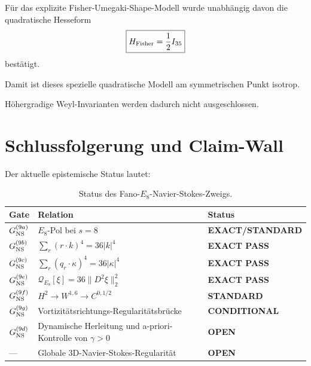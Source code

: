 \documentclass[11pt,twoside,a4paper]{article}
\begin{document}
	Für das explizite Fisher-Umegaki-Shape-Modell wurde unabhängig davon die quadratische Hesseform
	\begin{equation}
		\boxed{
			H_{\rm Fisher}
			=
			\frac{1}{2}
			I_{35}
		}
	\end{equation}
	bestätigt.
	
	Damit ist dieses spezielle quadratische Modell am symmetrischen Punkt isotrop.
	
	Höhergradige Weyl-Invarianten werden dadurch nicht ausgeschlossen.
	
	\section{Schlussfolgerung und Claim-Wall}
	
	Der aktuelle epistemische Status lautet:
	
	\begin{table}[htbp]
		\centering
		\caption{Status des Fano-$E_8$-Navier-Stokes-Zweigs.}
		\label{tab:claim_wall}
		\begin{tabular}{
				>{\raggedright\arraybackslash}p{}
				>{\raggedright\arraybackslash}p{}
				>{\raggedright\arraybackslash}p{}
			}
			\toprule
			Gate &
			Relation &
			Status
			\\
			\midrule
			
			$G_{\rm NS}^{(9a)}$
			&
			$E_8$-Pol bei $s=8$
			&
			\textbf{EXACT/STANDARD}
			\\
			
			$G_{\rm NS}^{(9b)}$
			&
			$\displaystyle
			\sum_r(r\cdot k)^4
			=
			36|k|^4$
			&
			\textbf{EXACT PASS}
			\\
			
			$G_{\rm NS}^{(9c)}$
			&
			$\displaystyle
			\sum_r(q_r\cdot\kappa)^4
			=
			36|\kappa|^4$
			&
			\textbf{EXACT PASS}
			\\
			
			$G_{\rm NS}^{(9e)}$
			&
			$\displaystyle
			\mathcal{Q}_{E_8}[\xi]
			=
			36\|D^2\xi\|_2^2$
			&
			\textbf{EXACT PASS}
			\\
			
			$G_{\rm NS}^{(9f)}$
			&
			$H^2\to W^{1,6}\to C^{0,1/2}$
			&
			\textbf{STANDARD}
			\\
			
			$G_{\rm NS}^{(9g)}$
			&
			Vortizitätsrichtungs-Regularitätsbrücke
			&
			\textbf{CONDITIONAL}
			\\
			
			$G_{\rm NS}^{(9d)}$
			&
			Dynamische Herleitung und a-priori-Kontrolle von $\gamma>0$
			&
			\textbf{OPEN}
			\\
			
			---
			&
			Globale 3D-Navier-Stokes-Regularität
			&
			\textbf{OPEN}
			\\
			
			\bottomrule
		\end{tabular}
	\end{table}
	
\end{document}
